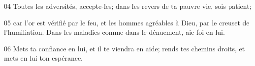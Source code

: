 
04 Toutes les adversités, accepte-les; dans les revers de ta pauvre vie, sois patient;

05 car l’or est vérifié par le feu, et les hommes agréables à Dieu, par le creuset de l’humiliation. Dans les maladies comme dans le dénuement, aie foi en lui.

06 Mets ta confiance en lui, et il te viendra en aide; rends tes chemins droits, et mets en lui ton espérance.
